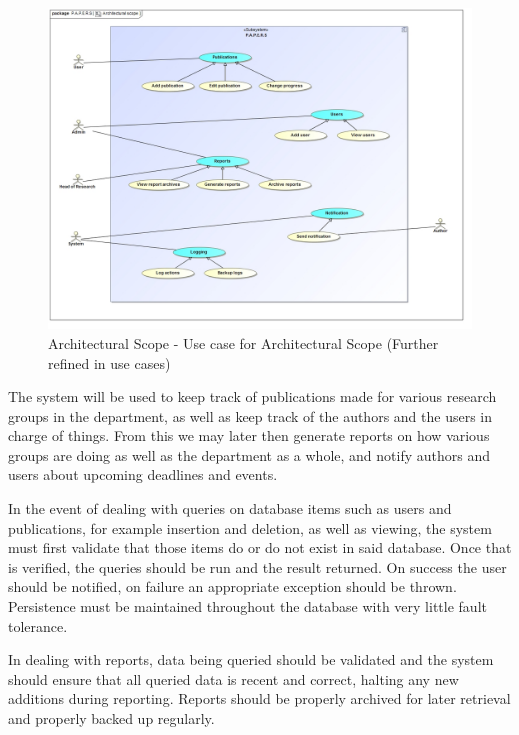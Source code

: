 \documentclass{article}
\begin{document}
		\begin{figure}[H]
			\includegraphics[width=\linewidth]{../../Diagrams/Architectural Scope/Architectural scope.jpg}
			\caption{Architectural Scope - Use case for Architectural Scope (Further refined in use cases)}
		\end{figure}
		
		\par The system will be used to keep track of publications made for various research groups in the department, as well as keep track of the authors and the users in charge of things. From this we may later then generate reports on how various groups are doing as well as the department as a whole, and notify authors and users about upcoming deadlines and events.\\
		
		\par In the event of dealing with queries on database items such as users and publications, for example insertion and deletion, as well as viewing, the system must first validate that those items do or do not exist in said database. Once that is verified, the queries should be run and the result returned. On success the user should be notified, on failure an appropriate exception should be thrown. Persistence must be maintained throughout the database with very little fault tolerance.\\
		
		\par In dealing with reports, data being queried should be validated and the system should ensure that all queried data is recent and correct, halting any new additions during reporting. Reports should be properly archived for later retrieval and properly backed up regularly.\\
		
\end{document}
